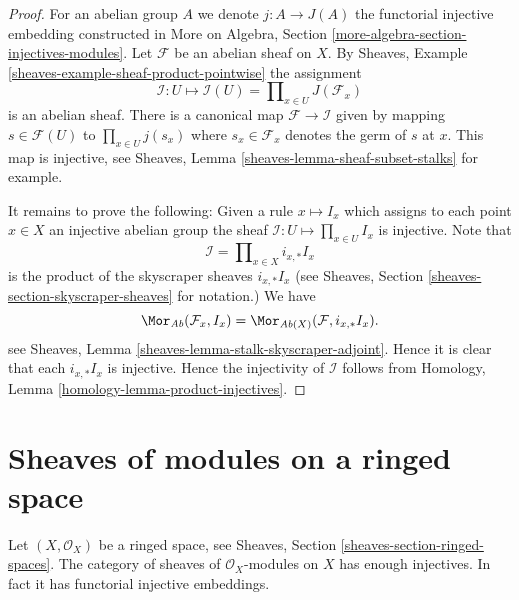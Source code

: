 \begin{proof}
For an abelian group $A$ we denote $j : A \to J(A)$ the functorial
injective embedding constructed in
More on Algebra, Section \ref{more-algebra-section-injectives-modules}.
Let $\mathcal{F}$ be an abelian sheaf on $X$.
By Sheaves, Example \ref{sheaves-example-sheaf-product-pointwise}
the assignment
$$
\mathcal{I} : U \mapsto
\mathcal{I}(U) = \prod\nolimits_{x\in U} J(\mathcal{F}_x)
$$
is an abelian sheaf. There is a canonical map $\mathcal{F} \to \mathcal{I}$
given by mapping $s \in \mathcal{F}(U)$ to $\prod_{x \in U} j(s_x)$
where $s_x \in \mathcal{F}_x$ denotes the germ of $s$ at $x$.
This map is injective, see
Sheaves, Lemma \ref{sheaves-lemma-sheaf-subset-stalks}
for example.

\medskip\noindent
It remains to prove the following: Given a rule
$x \mapsto I_x$ which assigns to each point $x \in X$ an injective
abelian group the sheaf $\mathcal{I} : U \mapsto \prod_{x \in U} I_x$
is injective. Note that
$$
\mathcal{I} = \prod\nolimits_{x \in X} i_{x, *}I_x
$$
is the product of the skyscraper sheaves $i_{x, *}I_x$ (see
Sheaves, Section \ref{sheaves-section-skyscraper-sheaves} for notation.)
We have
$$
\Mor_{\textit{Ab}}(\mathcal{F}_x, I_x)
=
\Mor_{\textit{Ab}(X)}(\mathcal{F}, i_{x, *}I_x).
$$
see Sheaves, Lemma \ref{sheaves-lemma-stalk-skyscraper-adjoint}. Hence it is
clear that each $i_{x, *}I_x$ is injective. Hence the injectivity of
$\mathcal{I}$ follows from
Homology, Lemma \ref{homology-lemma-product-injectives}.
\end{proof}









\section{Sheaves of modules on a ringed space}
\label{section-sheaves-modules-space}


\begin{lemma}
\label{lemma-sheaves-modules-space}
Let $(X, \mathcal{O}_X)$ be a ringed space, see
Sheaves, Section \ref{sheaves-section-ringed-spaces}.
The category of sheaves of $\mathcal{O}_X$-modules on $X$
has enough injectives. In fact it has functorial injective embeddings.
\end{lemma}

